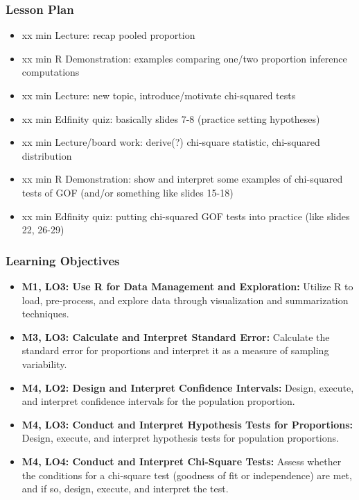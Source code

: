 \begin{frame}
    \frametitle{Lesson Plan}
    \begin{itemize}
        \item xx min Lecture: recap pooled proportion
        \item xx min R Demonstration: examples comparing one/two proportion inference computations
        \item xx min Lecture: new topic, introduce/motivate chi-squared tests
        \item xx min Edfinity quiz: basically slides 7-8 (practice setting hypotheses)
        \item xx min Lecture/board work: derive(?) chi-square statistic, chi-squared distribution
        \item xx min R Demonstration: show and interpret some examples of chi-squared tests of GOF (and/or something like slides 15-18)
        \item xx min Edfinity quiz: putting chi-squared GOF tests into practice (like slides 22, 26-29)
    \end{itemize}
\end{frame}
            
\begin{frame}
    \frametitle{Learning Objectives}
    \begin{itemize}
        \item \textbf{M1, LO3: Use R for Data Management and Exploration:} Utilize R to load, pre-process, and explore data through visualization and summarization techniques.
        \item \textbf{M3, LO3: Calculate and Interpret Standard Error:} Calculate the standard error for proportions and interpret it as a measure of sampling variability.
        \item \textbf{M4, LO2: Design and Interpret Confidence Intervals:} Design, execute, and interpret confidence intervals for the population proportion.
        \item \textbf{M4, LO3: Conduct and Interpret Hypothesis Tests for Proportions:} Design, execute, and interpret hypothesis tests for population proportions.
        \item \textbf{M4, LO4: Conduct and Interpret Chi-Square Tests:} Assess whether the conditions for a chi-square test (goodness of fit or independence) are met, and if so, design, execute, and interpret the test.
    \end{itemize}
\end{frame}
    

